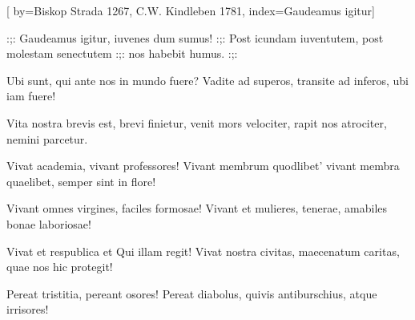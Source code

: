 [
by={Biskop Strada 1267, C.W. Kindleben 1781},
index={Gaudeamus igitur}]

\beginverse*
:;: Gaudeamus igitur,
iuvenes dum sumus! :;:
Post icundam iuventutem,
post molestam senectutem
:;: nos habebit humus. :;:
\endverse	

\beginverse*
Ubi sunt, qui ante nos
in mundo fuere?
Vadite ad superos,
transite ad inferos,
ubi iam fuere!
\endverse	

\beginverse*
Vita nostra brevis est,
brevi finietur,
venit mors velociter,
rapit nos atrociter,
nemini parcetur.
\endverse	

\beginverse*
Vivat academia,
vivant professores!
Vivant membrum quodlibet'
vivant membra quaelibet,
semper sint in flore!
\endverse	

\beginverse*
Vivant omnes virgines,
faciles formosae!
Vivant et mulieres,
tenerae, amabiles
bonae laboriosae!
\endverse	

\beginverse*
Vivat et respublica
et Qui illam regit!
Vivat nostra civitas,
maecenatum caritas,
quae nos hic protegit!
\endverse	

\beginverse*
Pereat tristitia,
pereant osores!
Pereat diabolus,
quivis antiburschius,
atque irrisores!
\endverse	
\endsong


